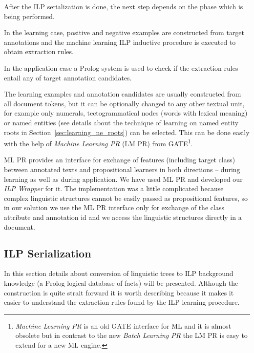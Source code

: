 After the ILP serialization is done, the next step depends on the phase which is being performed.

In the learning case, positive and negative examples are constructed from target annotations and the machine learning ILP inductive procedure is executed to obtain extraction rules.

In the application case a Prolog system is used to check if the extraction rules entail any of target annotation candidates.




The learning examples and annotation candidates are usually constructed from all document tokens, but it can be optionally changed to any other textual unit, for example only numerals, tectogrammatical nodes (words with lexical meaning) or named entities (see details about the technique of learning on named entity roots in Section~\ref{sec:learning_ne_roots}) can be selected. This can be done easily with the help of \emph{Machine Learning PR} (LM PR) from GATE\footnote{\emph{Machine Learning PR} is an old GATE interface for ML and it is almost obsolete but in contrast to the new \emph{Batch Learning PR} the LM PR is easy to extend for a new ML engine.}.

ML PR provides an interface for exchange of features (including target class) between annotated texts and propositional learners in both directions -- during learning as well as during application. We have used ML PR and developed our \emph{ILP Wrapper} for it. The implementation was a little complicated because complex linguistic structures cannot be easily passed as propositional features, so in our solution we use the ML PR interface only for exchange of the class attribute and annotation id and we access the linguistic structures directly in a document.



\subsection{ILP Serialization} \label{sec:learning_ilp_serialization}

In this section details about conversion of linguistic trees to ILP background knowledge (a Prolog logical database of facts) will be presented. Although the construction is quite strait forward it is worth describing because it makes it easier to understand the extraction rules found by the ILP learning procedure. 


